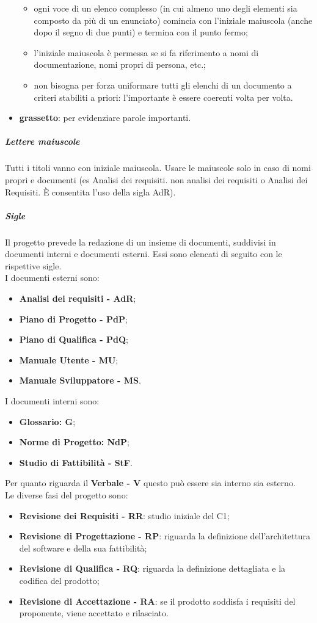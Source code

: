 \begin{itemize}
\begin{itemize}
								\item ogni voce di un elenco complesso (in cui almeno uno degli elementi sia composto da più di un enunciato) comincia con l’iniziale maiuscola (anche dopo il segno di due punti) e termina con il punto 										fermo;
								\item l’iniziale maiuscola è permessa se si fa riferimento a nomi di documentazione, nomi propri di persona, etc.;
								\item non bisogna per forza uniformare tutti gli elenchi di un documento a criteri stabiliti a priori: l’importante è essere coerenti volta per volta.
							\end{itemize}
						\item \textbf{grassetto}: per evidenziare parole importanti.
					\end{itemize}
				\subparagraph{Lettere maiuscole}
				Tutti i titoli vanno con iniziale maiuscola. Usare le maiuscole solo in caso di nomi propri e documenti (es Analisi dei requisiti. non analisi dei requisiti o Analisi dei Requisiti. È consentita l'uso della sigla AdR).
				\subparagraph{Sigle}
				Il progetto prevede la redazione di un insieme di documenti, suddivisi in documenti interni e documenti esterni. Essi sono elencati di seguito con le rispettive sigle.\\
				I documenti esterni sono:
				\begin{itemize}
				\item \textbf{Analisi dei requisiti - AdR};
				\item \textbf{Piano di Progetto - PdP};
				\item \textbf{Piano di Qualifica - PdQ};
				\item \textbf{Manuale Utente - MU};
				\item \textbf{Manuale Sviluppatore - MS}.
				\end{itemize}
				I documenti interni sono:
				\begin{itemize}
				\item \textbf{Glossario: G};
				\item \textbf{Norme di Progetto: NdP};
				\item \textbf{Studio di Fattibilità - StF}.
				\end{itemize}
				Per quanto riguarda il \textbf{Verbale - V} questo può essere sia interno sia esterno.
\\
				Le diverse fasi del progetto sono: 
				\begin{itemize}
				\item \textbf{Revisione dei Requisiti - RR}: studio iniziale del C1;
				\item \textbf{Revisione di Progettazione - RP}: riguarda la definizione dell'architettura del software e della sua fattibilità;
				\item \textbf{Revisione di Qualifica - RQ}: riguarda la definizione dettagliata e la codifica del prodotto;
				\item \textbf{Revisione di Accettazione - RA}: se il prodotto soddisfa i requisiti del proponente, viene accettato e rilasciato.
				\end{itemize}
